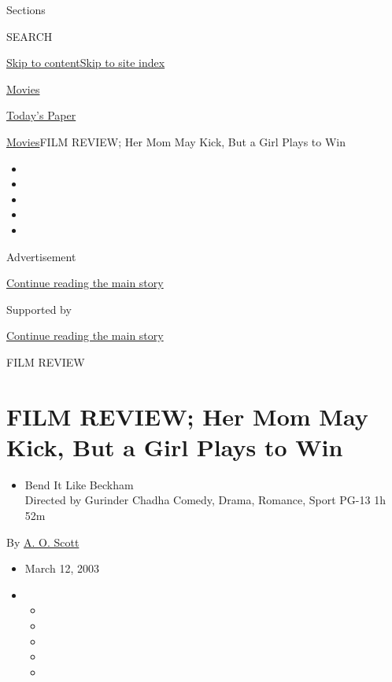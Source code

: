 Sections

SEARCH

\protect\hyperlink{site-content}{Skip to
content}\protect\hyperlink{site-index}{Skip to site index}

\href{https://www.nytimes.com/section/movies}{Movies}

\href{https://myaccount.nytimes.com/auth/login?response_type=cookie\&client_id=vi}{}

\href{https://www.nytimes.com/section/todayspaper}{Today's Paper}

\href{/section/movies}{Movies}\textbar{}FILM REVIEW; Her Mom May Kick,
But a Girl Plays to Win

\begin{itemize}
\item
\item
\item
\item
\item
\end{itemize}

Advertisement

\protect\hyperlink{after-top}{Continue reading the main story}

Supported by

\protect\hyperlink{after-sponsor}{Continue reading the main story}

FILM REVIEW

\hypertarget{film-review-her-mom-may-kick-but-a-girl-plays-to-win}{%
\section{FILM REVIEW; Her Mom May Kick, But a Girl Plays to
Win}\label{film-review-her-mom-may-kick-but-a-girl-plays-to-win}}

\begin{itemize}
\tightlist
\item
  Bend It Like Beckham\\
  Directed by Gurinder Chadha Comedy, Drama, Romance, Sport PG-13 1h 52m
\end{itemize}

By \href{https://www.nytimes.com/by/a-o-scott}{A. O. Scott}

\begin{itemize}
\item
  March 12, 2003
\item
  \begin{itemize}
  \item
  \item
  \item
  \item
  \item
  \end{itemize}
\end{itemize}

